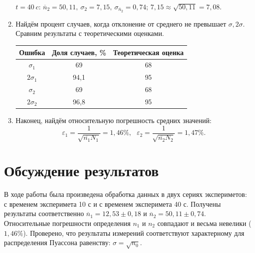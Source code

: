 \documentclass[a4paper, 12pt]{article}
\begin{document}
\begin{enumerate}
		\par
		$t = 40 \: c$: $\overline n_2 = 50,11, \:\sigma_{2} = 7,15, \: \sigma_{\overline n_2} = 0,74$; $7,15 \approx \sqrt{50,11} = 7,08$.
		\item Найдём процент случаев, когда отклонение от среднего не превышает $\sigma, 2\sigma$. Сравним результаты с теоретическими оценками.
		\begin{center}
			\begin{tabular}{|c|c|c|}
				\hline
				Ошибка & Доля случаев, \% & Теоретическая оценка \\\hline
				$\sigma_1$ & 69 & 68\\\hline
				$2\sigma_1$ & 94,1 & 95\\\hline \hline
				$\sigma_2$ & 69 & 68\\\hline
				$2\sigma_2$ & 96,8 & 95\\\hline 
			\end{tabular}    
		\end{center}
		\item Наконец, найдём относительную погрешность средних значений:
		\[ \varepsilon_1 = \frac{1}{\sqrt{\overline{n_1}N_1}} = 1,46 \%, \:\:\: \varepsilon_2 = \frac{1}{\sqrt{\overline{n_2}N_2}} = 1,47 \%.\]
	\end{enumerate}
\section{Обсуждение результатов}
В ходе работы была произведена обработка данных в двух сериях экспериметов: с временем эксперимета 10 с и с временем эксперимета 40 с. Получены результаты соответственно $\overline n_1 = 12,53 \pm 0,18$ и    $\overline n_2 = 50,11 \pm 0,74$. Относительные погрешности определения $n_1$ и $n_2$ совпадают и весьма невелики ($1,46 \%$). Проверено, что результаты измерений соответствуют характерному для распределения Пуассона равенству: $\sigma = \sqrt{n_0}$.
\end{document}
